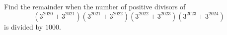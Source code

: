 Find the remainder when the number of positive divisors of
\[\left(3^{2020}+3^{2021}\right)\left(3^{2021}+3^{2022}\right)\left(3^{2022}+3^{2023}\right)\left(3^{2023}+3^{2024}\right)\]
is divided by $1000$.
